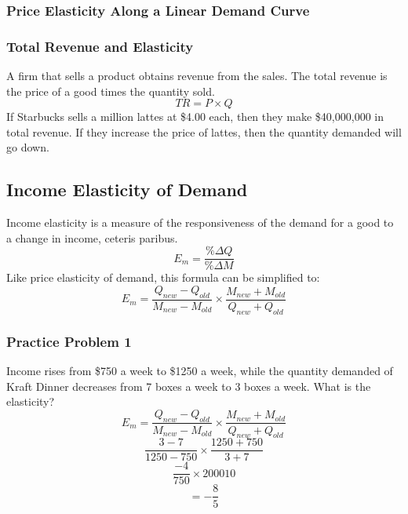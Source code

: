 \documentclass[letterpaper, 12pt]{article}
\begin{document}
\subsubsection{Price Elasticity Along a Linear Demand Curve}
\begin{center}
\end{center}

\subsubsection{Total Revenue and Elasticity}
A firm that sells a product obtains revenue from the sales. The total revenue
is the price of a good times the quantity sold.
\[ TR = P \times Q \]
If Starbucks sells a million lattes at \$4.00 each, then they make \$40,000,000
in total revenue. If they increase the price of lattes, then the quantity
demanded will go down.

\subsection{Income Elasticity of Demand}
Income elasticity is a measure of the responsiveness of the demand for a good to a change in income, ceteris paribus.
\[ E_{m} = \frac{\%\Delta Q}{\%\Delta M} \]
Like price elasticity of demand, this formula can be simplified to:
\[ E_{m} = \frac{Q_{new}-Q_{old}}{M_{new}-M_{old}}\times
           \frac{M_{new}+M_{old}}{Q_{new}+Q_{old}} \]

\subsubsection{Practice Problem 1}
Income rises from \$750 a week to \$1250 a week, while the quantity demanded
of Kraft Dinner decreases from 7 boxes a week to 3 boxes a week. What is the
elasticity?
\[ E_{m} = \frac{Q_{new}-Q_{old}}{M_{new}-M_{old}}\times
           \frac{M_{new}+M_{old}}{Q_{new}+Q_{old}} \]
\[ \frac{3-7}{1250-750}\times\frac{1250+750}{3+7} \]
\[ \frac{-4}{750}\times{2000}{10} \]
\[ = -\frac{8}{5} \]
\end{document}
